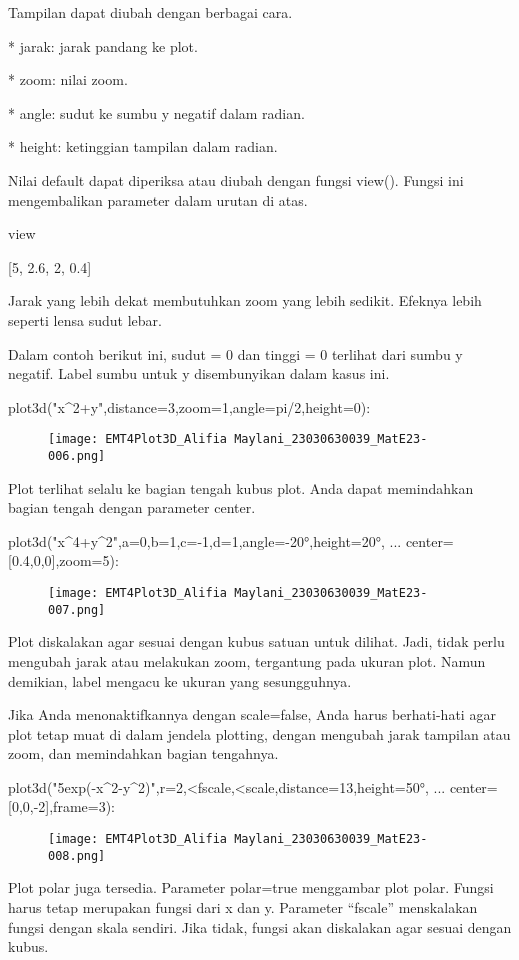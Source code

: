 \documentclass{article}
\begin{document}
Tampilan dapat diubah dengan berbagai cara.


* 
jarak: jarak pandang ke plot.

* 
zoom: nilai zoom.

* 
angle: sudut ke sumbu y negatif dalam radian.

* 
height: ketinggian tampilan dalam radian.


Nilai default dapat diperiksa atau diubah dengan fungsi view(). Fungsi
ini mengembalikan parameter dalam urutan di atas.


\>view


    [5,  2.6,  2,  0.4]

Jarak yang lebih dekat membutuhkan zoom yang lebih sedikit. Efeknya
lebih seperti lensa sudut lebar.


Dalam contoh berikut ini, sudut = 0 dan tinggi = 0 terlihat dari sumbu
y negatif. Label sumbu untuk y disembunyikan dalam kasus ini.


\>plot3d("x^2+y",distance=3,zoom=1,angle=pi/2,height=0):
\begin{figure}
    \centering
    \texttt{[image: EMT4Plot3D\_Alifia Maylani\_23030630039\_MatE23-006.png]}
    \caption{}
    \label{fig:enter-label}
\end{figure}
Plot terlihat selalu ke bagian tengah kubus plot. Anda dapat
memindahkan bagian tengah dengan parameter center.


\>plot3d("x^4+y^2",a=0,b=1,c=-1,d=1,angle=-20°,height=20°, ...  
\>     center=[0.4,0,0],zoom=5):


\begin{figure}
    \centering
    \texttt{[image: EMT4Plot3D\_Alifia Maylani\_23030630039\_MatE23-007.png]}
    \caption{}
    \label{fig:enter-label}
\end{figure}

Plot diskalakan agar sesuai dengan kubus satuan untuk dilihat. Jadi,
tidak perlu mengubah jarak atau melakukan zoom, tergantung pada ukuran
plot. Namun demikian, label mengacu ke ukuran yang sesungguhnya.


Jika Anda menonaktifkannya dengan scale=false, Anda harus berhati-hati
agar plot tetap muat di dalam jendela plotting, dengan mengubah jarak
tampilan atau zoom, dan memindahkan bagian tengahnya.


\>plot3d("5\*exp(-x^2-y^2)",r=2,<fscale,<scale,distance=13,height=50°, ...  
\>     center=[0,0,-2],frame=3):


\begin{figure}
    \centering
    \texttt{[image: EMT4Plot3D\_Alifia Maylani\_23030630039\_MatE23-008.png]}
    \caption{}
    \label{fig:enter-label}
\end{figure}
Plot polar juga tersedia. Parameter polar=true menggambar plot polar.
Fungsi harus tetap merupakan fungsi dari x dan y. Parameter “fscale”
menskalakan fungsi dengan skala sendiri. Jika tidak, fungsi akan
diskalakan agar sesuai dengan kubus.
\end{document}
